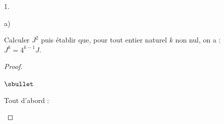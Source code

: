 \documentclass[11pt]{article}%
\begin{document}
\begin{noliste}{1.}
\item
  \begin{noliste}{a)}
    \setlength{\itemsep}{2mm}
  \item Calculer $J^{2}$ puis établir que, pour tout entier naturel
    $k$ non nul, on a : $J^{k} = 4^{k-1} J$.

    \begin{proof}~%
      \begin{noliste}{$\sbullet$}
      \item Tout d'abord : %
        




\end{noliste}
\end{proof}
\end{noliste}
\end{noliste}
\end{document}
